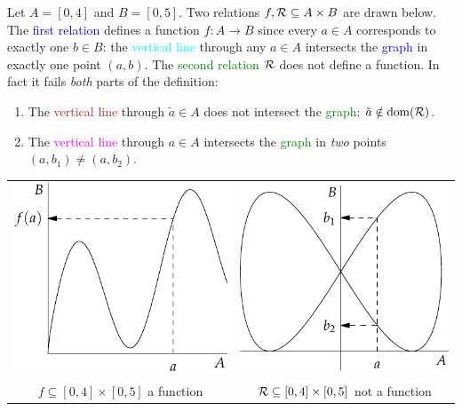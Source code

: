 \begin{example}{}{}
	Let $A=[0,4]$ and $B=[0,5]$. Two relations $f,\mathcal{R}\subseteq A\times B$ are drawn below.\smallbreak
	The \textcolor{blue}{first relation} defines a function $f:A\to B$ since every $a\in A$ corresponds to exactly one $b\in B$: the \textcolor{cyan}{vertical line} through any $a\in A$ intersects the \textcolor{blue}{graph} in exactly one point $(a,b)$.\smallbreak
	The \textcolor{Green}{second relation} $\mathcal{R}$ does not define a function. In fact it fails \emph{both} parts of the definition:
	\begin{enumerate}\itemsep0pt
	  \item The \textcolor{Brown}{vertical line} through $\tilde a\in A$ does not intersect the \textcolor{Green}{graph}: $\tilde a\notin\operatorname{dom}(\mathcal{R})$.
	  \item The \textcolor{Magenta}{vertical line} through $a\in A$ intersects the \textcolor{Green}{graph} in \emph{two} points $(a,b_1)\neq (a,b_2)$.
	\end{enumerate}
	\begin{center}
	\begin{tabular}{c@{\qquad\qquad}c}
		\includegraphics{relations-05-funcvert}
		&
		\includegraphics{relations-06-funcvert}
		\\
		$f\subseteq [0,4]\times[0,5]$ a function
		&
		$\mathcal{R}\subseteq [0,4]\times[0,5]$ not a function
	\end{tabular}
	\end{center}
\end{example}

